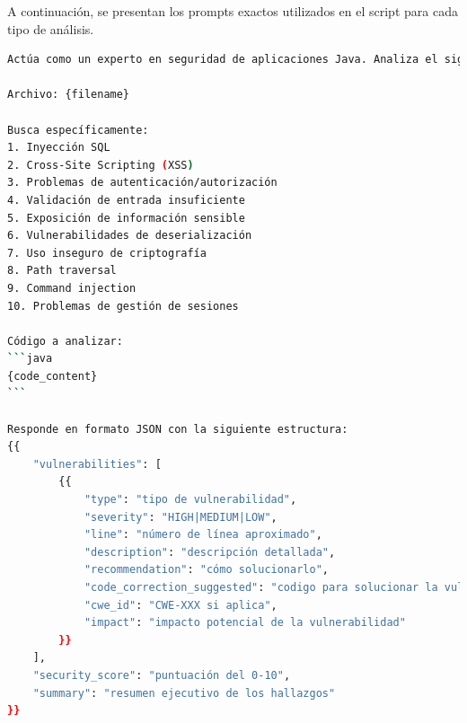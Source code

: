 A continuación, se presentan los prompts exactos utilizados en el script para cada tipo de análisis.

\begin{lstlisting}[language=bash, caption={Prompt para el análisis de seguridad de ficheros Java.}, label={lst:prompt_sec}]
Actúa como un experto en seguridad de aplicaciones Java. Analiza el siguiente código fuente para identificar vulnerabilidades de seguridad:

Archivo: {filename}

Busca específicamente:
1. Inyección SQL
2. Cross-Site Scripting (XSS)
3. Problemas de autenticación/autorización
4. Validación de entrada insuficiente
5. Exposición de información sensible
6. Vulnerabilidades de deserialización
7. Uso inseguro de criptografía
8. Path traversal
9. Command injection
10. Problemas de gestión de sesiones

Código a analizar:
```java
{code_content}
```

Responde en formato JSON con la siguiente estructura:
{{
    "vulnerabilities": [
        {{
            "type": "tipo de vulnerabilidad",
            "severity": "HIGH|MEDIUM|LOW",
            "line": "número de línea aproximado",
            "description": "descripción detallada",
            "recommendation": "cómo solucionarlo",
            "code_correction_suggested": "codigo para solucionar la vulnerabilidad",
            "cwe_id": "CWE-XXX si aplica",
            "impact": "impacto potencial de la vulnerabilidad"
        }}
    ],
    "security_score": "puntuación del 0-10",
    "summary": "resumen ejecutivo de los hallazgos"
}}
\end{lstlisting}

